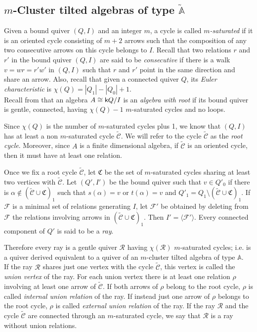 \documentclass{amsart}
\theoremstyle{plain}
\theoremstyle{definition}
\begin{document}
\subsection{$m$-Cluster tilted algebras of type $\widetilde{\mathbb{A}}$}

Given a bound quiver $(Q,I)$ and an integer $m$, a cycle is called \emph{ $m$-saturated} if it is an oriented cycle consisting of $m+2$ arrows such that the composition of any two consecutive arrows on this cycle belongs to $I$. Recall that two relations  $r$ and $r'$ in the bound quiver $(Q,I)$ are said to be   \textit{consecutive} if there is a walk  $v=wr=r'w'$ in  $(Q,I)$ such that $r$ and $r'$ point in the same direction and share an arrow. Also, recall that given a connected quiver $Q$, its \emph{Euler characteristic} is  $\chi(Q)=|Q_1|-|Q_0|+1$.\\

Recall from \cite[Definition 7.2]{Gubitosi} that an algebra  $A\cong {{\normalfont{\textsf{k}}}} Q/I$ is an  \textit{algebra with root } if its bound quiver is gentle, connected, having $\chi(Q)-1$  $m$-saturated cycles and no loops.

  Since  $\chi(Q)$ is the number of $m$-saturated cycles plus 1, we know that  $(Q,I)$  has at least a non $m$-saturated cycle $\widetilde{\mathcal{C}}$. We will refer to the  cycle $\widetilde{\mathcal{C}}$ as the  \textit{root cycle}. Moreover, since $A$ is a finite dimensional algebra, if $\widetilde{\mathcal{C}}$ is an oriented cycle, then it must have at least one relation.

Once we fix a root cycle $\widetilde{\mathcal{C}}$, let $\mathfrak{C}$ be the set of $m$-saturated cycles sharing at least two vertices with $\widetilde{\mathcal{C}}$. Let $(Q',I')$ be the bound quiver such that $v\in Q'_0$ if there is $\alpha \not \in (\widetilde{\mathcal{C}}\cup\mathfrak{C})_1$ such that   $s(\alpha)=v$ or $t(\alpha)=v$ and $Q'_1=Q_1\setminus (\widetilde{\mathcal{C}}\cup\mathfrak{C})_1$. If $\mathcal{F}$ is a minimal set of relations generating $I$, let $\mathcal{F'}$ be obtained by deleting from $\mathcal{F}$ the relations involving arrows in $(\widetilde{\mathcal{C}}\cup\mathfrak{C})_1$. Then $I'=\langle \mathcal{F'} \rangle $.  Every connected component of $Q'$ is said to be a \textit{ray}.

Therefore every ray is  a gentle  quiver $\mathcal{R}$ having $\chi(\mathcal{R})$ $m$-saturated cycles; i.e. is a quiver derived equivalent to a quiver of an $m$-cluster tilted algebra of type $\mathbb{A}$. \\
If the ray $\mathcal{R}$ shares just one vertex with the cycle $\widetilde{\mathcal{C}}$, this vertex is called the \emph{union vertex} of the ray. For each union vertex there is at least one relation $\rho$ involving at least one arrow of $\widetilde{\mathcal{C}}$. If both arrows of $\rho$ belong to the root cycle, $\rho$ is called \textit{internal union relation} of the ray. If instead  just one arrow of $\rho$ belongs to the root cycle, $\rho$ is called \textit{external union relation} of the ray.
If the ray $\mathcal{R}$  and the cycle $\widetilde{\mathcal{C}}$ are connected through an  $m$-saturated cycle, we say that $\mathcal{R}$ is a ray without union relations.
\end{document}
